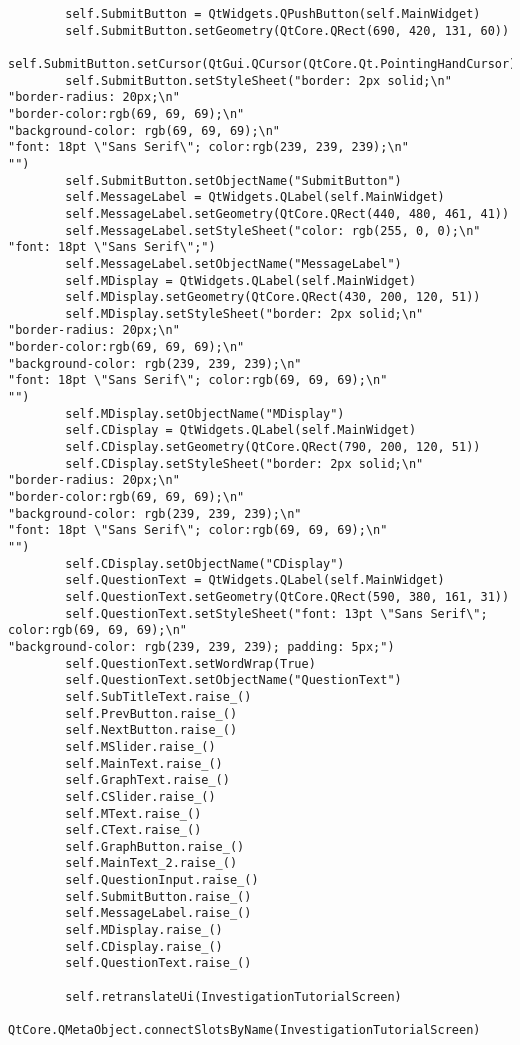 \documentclass{article}
\begin{document}
\begin{lstlisting}
        self.SubmitButton = QtWidgets.QPushButton(self.MainWidget)
        self.SubmitButton.setGeometry(QtCore.QRect(690, 420, 131, 60))
        self.SubmitButton.setCursor(QtGui.QCursor(QtCore.Qt.PointingHandCursor))
        self.SubmitButton.setStyleSheet("border: 2px solid;\n"
"border-radius: 20px;\n"
"border-color:rgb(69, 69, 69);\n"
"background-color: rgb(69, 69, 69);\n"
"font: 18pt \"Sans Serif\"; color:rgb(239, 239, 239);\n"
"")
        self.SubmitButton.setObjectName("SubmitButton")
        self.MessageLabel = QtWidgets.QLabel(self.MainWidget)
        self.MessageLabel.setGeometry(QtCore.QRect(440, 480, 461, 41))
        self.MessageLabel.setStyleSheet("color: rgb(255, 0, 0);\n"
"font: 18pt \"Sans Serif\";")
        self.MessageLabel.setObjectName("MessageLabel")
        self.MDisplay = QtWidgets.QLabel(self.MainWidget)
        self.MDisplay.setGeometry(QtCore.QRect(430, 200, 120, 51))
        self.MDisplay.setStyleSheet("border: 2px solid;\n"
"border-radius: 20px;\n"
"border-color:rgb(69, 69, 69);\n"
"background-color: rgb(239, 239, 239);\n"
"font: 18pt \"Sans Serif\"; color:rgb(69, 69, 69);\n"
"")
        self.MDisplay.setObjectName("MDisplay")
        self.CDisplay = QtWidgets.QLabel(self.MainWidget)
        self.CDisplay.setGeometry(QtCore.QRect(790, 200, 120, 51))
        self.CDisplay.setStyleSheet("border: 2px solid;\n"
"border-radius: 20px;\n"
"border-color:rgb(69, 69, 69);\n"
"background-color: rgb(239, 239, 239);\n"
"font: 18pt \"Sans Serif\"; color:rgb(69, 69, 69);\n"
"")
        self.CDisplay.setObjectName("CDisplay")
        self.QuestionText = QtWidgets.QLabel(self.MainWidget)
        self.QuestionText.setGeometry(QtCore.QRect(590, 380, 161, 31))
        self.QuestionText.setStyleSheet("font: 13pt \"Sans Serif\"; color:rgb(69, 69, 69);\n"
"background-color: rgb(239, 239, 239); padding: 5px;")
        self.QuestionText.setWordWrap(True)
        self.QuestionText.setObjectName("QuestionText")
        self.SubTitleText.raise_()
        self.PrevButton.raise_()
        self.NextButton.raise_()
        self.MSlider.raise_()
        self.MainText.raise_()
        self.GraphText.raise_()
        self.CSlider.raise_()
        self.MText.raise_()
        self.CText.raise_()
        self.GraphButton.raise_()
        self.MainText_2.raise_()
        self.QuestionInput.raise_()
        self.SubmitButton.raise_()
        self.MessageLabel.raise_()
        self.MDisplay.raise_()
        self.CDisplay.raise_()
        self.QuestionText.raise_()

        self.retranslateUi(InvestigationTutorialScreen)
        QtCore.QMetaObject.connectSlotsByName(InvestigationTutorialScreen)


\end{lstlisting}
\end{document}
